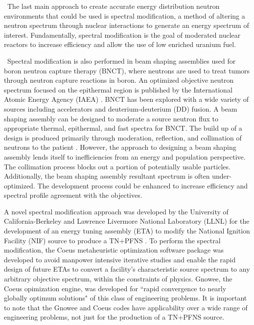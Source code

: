 \ The last main approach to create accurate energy distribution neutron environments that could be used is spectral modification,  a method of altering a neutron spectrum through nuclear interactions to generate an energy spectrum of interest. 
Fundamentally, spectral modification is the goal of moderated nuclear reactors to increase efficiency and allow the use of low enriched uranium fuel. 

\ Spectral modification is also performed in beam shaping assemblies used for boron neutron capture therapy (BNCT), where neutrons are used to treat tumors through neutron capture reactions in boron. 
An optimized objective neutron spectrum focused on the epithermal region is published by the International Atomic Energy Agency (IAEA) \cite{Kasesaz2016}. 
BNCT has been explored with a wide variety of sources including accelerators and deuterium-deuterium (DD) fusion. 
A beam shaping assembly can be designed to moderate a source neutron flux to appropriate thermal, epithermal, and fast spectra for BNCT\cite{Ardana2017}. 
The build up of a design is produced primarily through moderation, reflection, and collimation of neutrons to the patient \cite{Zaidi2018}. 
However, the approach to designing a beam shaping assembly lends itself to inefficiencies from an energy and population perspective.  The collimation process blocks out a portion of potentially usable particles. Additionally, the beam shaping assembly resultant spectrum is often under-optimized. The development process could be enhanced to increase efficiency and spectral profile agreement with the objectives. 

A novel spectral modification approach was developed by the University of California-Berkeley and Lawrence Livermore National Laboratory (LLNL) for the development of an energy tuning assembly (ETA) to modify the National Ignition Facility (NIF) source to produce a TN+PFNS \cite{Bevins}. 
To perform the spectral modification, the Coeus metaheuristic optimization software package was developed to avoid manpower intensive iterative studies and enable the rapid design of future ETAs to convert a facility's characteristic source spectrum to any arbitrary objective spectrum, within the constraints of physics\cite{Coeus}. 
Gnowee, the Coeus opimization engine, was developed for ``rapid convergence to nearly globally optimum solutions" of this class of engineering problems\cite{Bevins2018}. 
It is important to note that the Gnowee and Coeus codes have applicability over a wide range of engineering problems, not just for the production of a TN+PFNS source.  

